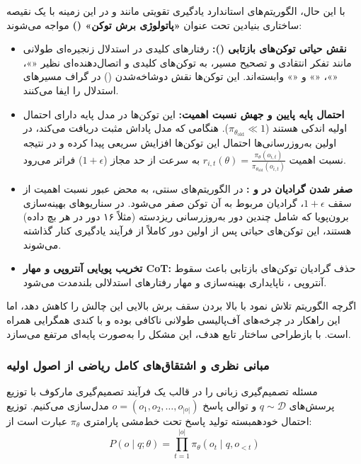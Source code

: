 با این حال، الگوریتم‌های استاندارد یادگیری تقویتی مانند  \cite{schulman2017proximal} و  \cite{shao2024deepseekmath} در این زمینه با یک نقیصه ساختاری بنیادین تحت عنوان \textbf{«پاتولوژی برش توکن» ()} مواجه می‌شوند:
\begin{itemize}
    \item \textbf{نقش حیاتی توکن‌های بازتابی ():} رفتارهای کلیدی در استدلال زنجیره‌ای طولانی مانند تفکر انتقادی و تصحیح مسیر، به توکن‌های کلیدی و اتصال‌دهنده‌ای نظیر «»، «»، «» و «» وابسته‌اند. این توکن‌ها نقش دوشاخه‌شدن () در گراف مسیرهای استدلال را ایفا می‌کنند.
    \item \textbf{احتمال پایه پایین و جهش نسبت اهمیت:} این توکن‌ها در مدل پایه دارای احتمال اولیه اندکی هستند ($\pi_{\theta_{\text{old}}} \ll 1$). هنگامی که مدل پاداش مثبت دریافت می‌کند، در اولین به‌روزرسانی‌ها احتمال این توکن‌ها افزایش سریعی پیدا کرده و در نتیجه نسبت اهمیت $r_{i,t}(\theta) = \frac{\pi_\theta(o_{i,t})}{\pi_{\theta_{\text{old}}}(o_{i,t})}$ به سرعت از حد مجاز ($1 + \epsilon$) فراتر می‌رود.
    \item \textbf{صفر شدن گرادیان در  و :} در الگوریتم‌های سنتی، به محض عبور نسبت اهمیت از سقف $1+\epsilon$، گرادیان مربوط به آن توکن صفر می‌شود. در سناریوهای بهینه‌سازی برون‌پویا که شامل چندین دور به‌روزرسانی ریزدسته (مثلاً ۱۶ دور در هر بچ داده) هستند، این توکن‌های حیاتی پس از اولین دور کاملاً از فرآیند یادگیری کنار گذاشته می‌شوند.
    \item \textbf{تخریب پویایی آنتروپی و مهار CoT:} حذف گرادیان توکن‌های بازتابی باعث سقوط آنتروپی \cite{cui2025entropy, wang2025beyond}، ناپایداری بهینه‌سازی و مهار رفتارهای استدلالی بلندمدت می‌شود.
\end{itemize}

اگرچه الگوریتم  \cite{yu2025dapo} تلاش نمود با بالا بردن سقف برش بالایی این چالش را کاهش دهد، اما این راهکار در چرخه‌های آف‌پالیسی طولانی ناکافی بوده و با کندی همگرایی همراه است.  با بازطراحی ساختار تابع هدف، این مشکل را به‌صورت پایه‌ای مرتفع می‌سازد.

\subsubsection*{مبانی نظری و اشتقاق‌های کامل ریاضی از اصول اولیه}

مسئله تصمیم‌گیری زبانی را در قالب یک فرآیند تصمیم‌گیری مارکوف با توزیع پرسش‌های $q \sim \mathcal{D}$ و توالی پاسخ $o = (o_1, o_2, \dots, o_{|o|})$ مدل‌سازی می‌کنیم. توزیع احتمال خودهمبسته تولید پاسخ تحت خط‌مشی پارامتری $\pi_\theta$ عبارت است از:
\begin{equation}
	P(o \mid q; \theta) = \prod_{t=1}^{|o|} \pi_\theta(o_t \mid q, o_{<t})
\end{equation}

